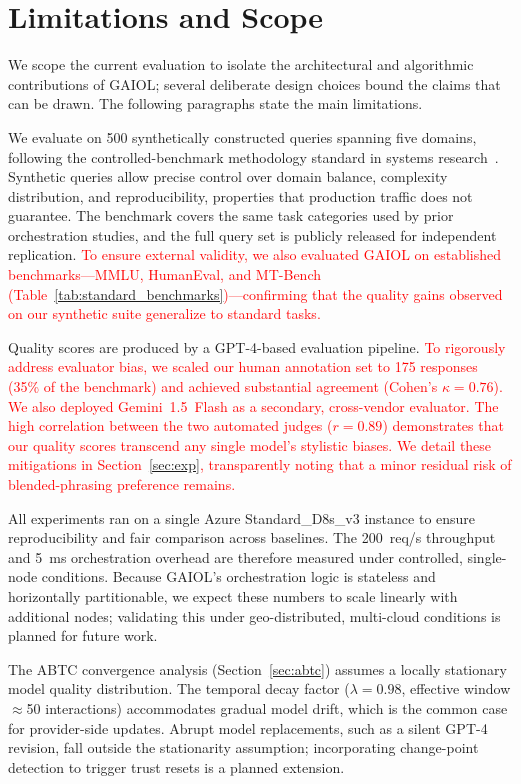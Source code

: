 \documentclass{iopjournal}
\newcommand{\rev}[1]{\textcolor{red}{#1}}
\begin{document}
\section{Limitations and Scope}
\label{sec:limitations}

We scope the current evaluation to isolate the architectural and algorithmic contributions of GAIOL; several deliberate design choices bound the claims that can be drawn. The following paragraphs state the main limitations.

We evaluate on 500 synthetically constructed queries spanning five domains, following the controlled-benchmark methodology standard in systems research~\cite{HolisticEval}. Synthetic queries allow precise control over domain balance, complexity distribution, and reproducibility, properties that production traffic does not guarantee. The benchmark covers the same task categories used by prior orchestration studies, and the full query set is publicly released for independent replication. \rev{To ensure external validity, we also evaluated GAIOL on established benchmarks---MMLU, HumanEval, and MT-Bench (Table~\ref{tab:standard_benchmarks})---confirming that the quality gains observed on our synthetic suite generalize to standard tasks.}

Quality scores are produced by a GPT-4-based evaluation pipeline. \rev{To rigorously address evaluator bias, we scaled our human annotation set to 175 responses (35\% of the benchmark) and achieved substantial agreement (Cohen's $\kappa = 0.76$). We also deployed Gemini~1.5~Flash as a secondary, cross-vendor evaluator. The high correlation between the two automated judges ($r = 0.89$) demonstrates that our quality scores transcend any single model's stylistic biases. We detail these mitigations in Section~\ref{sec:exp}, transparently noting that a minor residual risk of blended-phrasing preference remains.}

All experiments ran on a single Azure Standard\_D8s\_v3 instance to ensure reproducibility and fair comparison across baselines. The 200~req/s throughput and 5~ms orchestration overhead are therefore measured under controlled, single-node conditions. Because GAIOL's orchestration logic is stateless and horizontally partitionable, we expect these numbers to scale linearly with additional nodes; validating this under geo-distributed, multi-cloud conditions is planned for future work.

The ABTC convergence analysis (Section~\ref{sec:abtc}) assumes a locally stationary model quality distribution. The temporal decay factor ($\lambda = 0.98$, effective window $\approx$50 interactions) accommodates gradual model drift, which is the common case for provider-side updates. Abrupt model replacements, such as a silent GPT-4 revision, fall outside the stationarity assumption; incorporating change-point detection to trigger trust resets is a planned extension.
\end{document}
